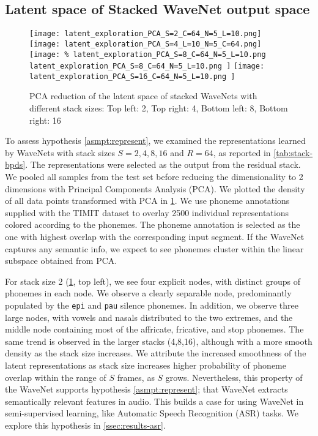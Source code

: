 \subsection{Latent space of Stacked WaveNet output space}\label{ssec:res-latents}
\begin{figure}[htb]
    \centering
        \texttt{[image:  
        latent\_exploration\_PCA\_S=2\_C=64\_N=5\_L=10.png]}%
        \texttt{[image:  
        latent\_exploration\_PCA\_S=4\_L=10\_N=5\_C=64.png]}%
    \\
        \texttt{[image: 
        \% latent\_exploration\_PCA\_S=8\_C=64\_N=5\_L=10.png
        latent\_exploration\_PCA\_S=8\_C=64\_N=5\_L=10.png
        ]}%
        \texttt{[image: 
        latent\_exploration\_PCA\_S=16\_C=64\_N=5\_L=10.png
        ]}%
    
    \caption{PCA reduction of the latent space of stacked WaveNets with different stack sizes: Top left: 2, Top right: 4, Bottom left: 8, Bottom right: 16}
    \label{fig:wavenet-lat}
\end{figure}


To assess hypothesis \ref{asmpt:represent}, we examined the representations learned by WaveNets with stack sizes $S={2, 4, 8, 16}$ and $R=64$, as reported in \cref{tab:stack-bpds}.
The representations were selected as the output from the residual stack. We pooled all samples from the test set before reducing the dimensionality to 2 dimensions with Principal Components Analysis (PCA). 
We plotted the density of all data points transformed with PCA in \cref{fig:wavenet-lat}. We use phoneme annotations supplied with the TIMIT dataset to overlay 2500 individual representations colored according to the phonemes. The phoneme annotation is selected as the one with highest overlap with the corresponding input segment.
If the WaveNet captures any semantic info, we expect to see phonemes cluster within the linear subspace obtained from PCA. 


For stack size 2 (\cref{fig:wavenet-lat}, top left), we see four explicit nodes, with distinct groups of phonemes in each node.
We observe a clearly separable node, predominantly populated by the \texttt{epi} and \texttt{pau} silence phonemes.
In addition, we observe three large nodes, with vowels and nasals distributed to the two extremes, and the middle node containing most of the affricate, fricative, and stop phonemes.
The same trend is observed in the larger stacks (4,8,16), although with a more smooth density as the stack size increases.
We attribute the increased smoothness of the latent representations as stack size increases higher probability of phoneme overlap within the range of $S$ frames, as $S$ grows.
Nevertheless, this property of the WaveNet supports hypothesis \ref{asmpt:represent}; that WaveNet extracts semantically relevant features in audio.
This builds a case for using WaveNet in semi-supervised learning, like Automatic Speech Recognition (ASR) tasks. 
We explore this hypothesis in \cref{ssec:results-asr}.


